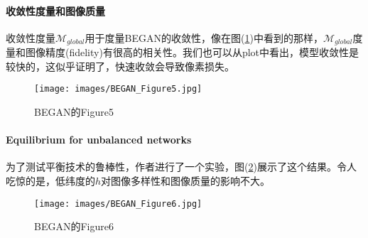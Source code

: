             \paragraph{收敛性度量和图像质量}收敛性度量$\mathcal{M}_{global}$用于度量BEGAN的收敛性，像在图(\ref{fig:BEGAN的Figure5})中看到的那样，$\mathcal{M}_{global}$度量和图像精度(fidelity)有很高的相关性。我们也可以从plot中看出，模型收敛性是较快的，这似乎证明了，快速收敛会导致像素损失。
                \begin{figure}[H]
                \centering
                \texttt{[image: images/BEGAN\_Figure5.jpg]}
                \caption{BEGAN的Figure5}
                \label{fig:BEGAN的Figure5}
                \end{figure}
            \paragraph{Equilibrium for unbalanced networks}为了测试平衡技术的鲁棒性，作者进行了一个实验，图(\ref{fig:BEGAN的Figure6})展示了这个结果。令人吃惊的是，低纬度的$h$对图像多样性和图像质量的影响不大。
                \begin{figure}[H]
                \centering
                \texttt{[image: images/BEGAN\_Figure6.jpg]}
                \caption{BEGAN的Figure6}
                \label{fig:BEGAN的Figure6}
                \end{figure}





